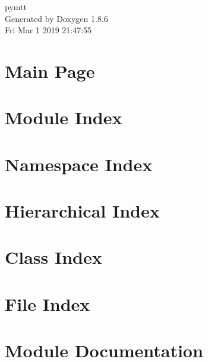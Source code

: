 \documentclass[twoside]{book}
\newcommand{\clearemptydoublepage}{%
  \newpage{\pagestyle{empty}\cleardoublepage}%
}
\begin{document}
\hypersetup{pageanchor=false}
\begin{titlepage}
\vspace*{7cm}
\begin{center}%
{\Large pymtt }\\
\vspace*{1cm}
{\large Generated by Doxygen 1.8.6}\\
\vspace*{0.5cm}
{\small Fri Mar 1 2019 21:47:55}\\
\end{center}
\end{titlepage}
\clearemptydoublepage
\tableofcontents
\clearemptydoublepage
{}
\hypersetup{pageanchor=true}

\chapter{Main Page}
\label{index}\hypertarget{index}{}
\chapter{Module Index}

\chapter{Namespace Index}

\chapter{Hierarchical Index}

\chapter{Class Index}

\chapter{File Index}

\chapter{Module Documentation}






















\end{document}
